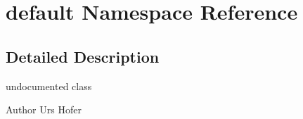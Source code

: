 \hypertarget{namespacedefault}{
\section{default \-Namespace \-Reference}
\label{namespacedefault}
}


\subsection{\-Detailed \-Description}
undocumented class

\begin{DoxyAuthor}{\-Author}
\-Urs \-Hofer 
\end{DoxyAuthor}
